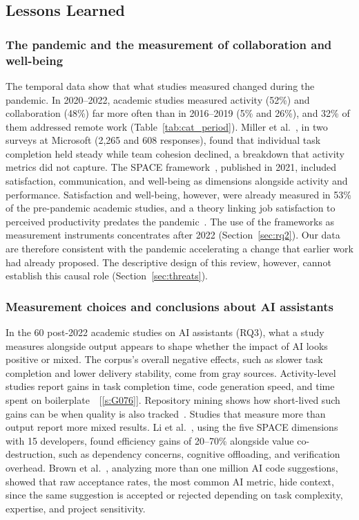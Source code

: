\documentclass[preprint,number]{elsarticle}
\newcounter{study}
\newcommand{\refG}[1]{\ref{s:#1}}
\begin{document}
\subsection{Lessons Learned}

\subsubsection{The pandemic and the measurement of collaboration and well-being}

The temporal data show that what studies measured changed during the pandemic. In 2020--2022, academic studies measured activity (52\%) and collaboration (48\%) far more often than in 2016--2019 (5\% and 26\%), and 32\% of them addressed remote work (Table~\ref{tab:cat_period}). Miller et al.~\cite{P1503}, in two surveys at Microsoft (2,265 and 608 responses), found that individual task completion held steady while team cohesion declined, a breakdown that activity metrics did not capture. The SPACE framework~\cite{P1259}, published in 2021, included satisfaction, communication, and well-being as dimensions alongside activity and performance. Satisfaction and well-being, however, were already measured in 53\% of the pre-pandemic academic studies, and a theory linking job satisfaction to perceived productivity predates the pandemic~\cite{P2107}. The use of the frameworks as measurement instruments concentrates after 2022 (Section~\ref{sec:rq2}). Our data are therefore consistent with the pandemic accelerating a change that earlier work had already proposed. The descriptive design of this review, however, cannot establish this causal role (Section~\ref{sec:threats}).

\subsubsection{Measurement choices and conclusions about AI assistants}

In the 60 post-2022 academic studies on AI assistants (RQ3), what a study measures alongside output appears to shape whether the impact of AI looks positive or mixed. The corpus's overall negative effects, such as slower task completion and lower delivery stability, come from gray sources. Activity-level studies report gains in task completion time, code generation speed, and time spent on boilerplate~\cite{P0549, P2029}~[\refG{G076}]. Repository mining shows how short-lived such gains can be when quality is also tracked~\cite{P2032}. Studies that measure more than output report more mixed results. Li et al.~\cite{P1303}, using the five SPACE dimensions with 15 developers, found efficiency gains of 20--70\% alongside value co-destruction, such as dependency concerns, cognitive offloading, and verification overhead. Brown et al.~\cite{P1402}, analyzing more than one million AI code suggestions, showed that raw acceptance rates, the most common AI metric, hide context, since the same suggestion is accepted or rejected depending on task complexity, expertise, and project sensitivity.
\end{document}
